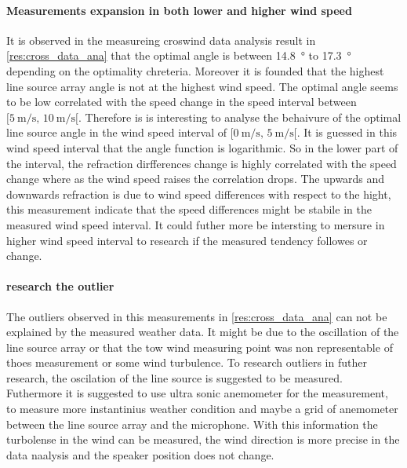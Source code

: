 \paragraph{Measurements expansion in both lower and higher wind speed} 
It is observed in the measureing croswind data analysis result in \autoref{res:cross_data_ana} that the optimal angle is between \SI{14.8}{\degree} to \SI{17.3}{\degree} depending on the optimality chreteria. Moreover it is founded that the highest line source array angle is not at the highest wind speed. The optimal angle seems to be low correlated with the speed change in the speed interval between $[\SI{5}{\meter\per\second},\, \SI{10}{\meter\per\second}[ $. Therefore is is interesting to analyse the behaivure of the optimal line source angle in the wind speed interval of $[\SI{0}{\meter\per\second},\, \SI{5}{\meter\per\second}[ $. It is guessed in this wind speed interval that the angle function is logarithmic. So in the lower part of the interval, the refraction dirfferences change is highly correlated with the speed change where as the wind speed raises the correlation drops. The upwards and downwards refraction is due to wind speed differences with respect to the hight, this measurement indicate that the speed differences might be stabile in the measured wind speed interval. It could futher more be intersting to mersure in higher wind speed interval to research if the measured tendency followes or change. 



\paragraph{research the outlier}
The outliers observed in this measurements in \autoref{res:cross_data_ana} can not be explained by the measured weather data. It might be due to the oscillation of the line source array or that the tow wind measuring point was non representable of thoes measurement or some wind turbulence. To research outliers in futher research, the oscilation of the line source is suggested to be measured. Futhermore it is suggested to use ultra sonic anemometer for the measurement, to measure more instantinius weather condition and maybe a grid of anemometer between the line source array and the microphone. With this information the turbolense in the wind can be measured, the wind direction is more precise in the data naalysis and the speaker position does not change. 




